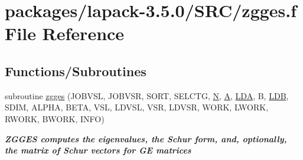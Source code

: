 \hypertarget{zgges_8f}{}\section{packages/lapack-\/3.5.0/\+S\+R\+C/zgges.f File Reference}
\label{zgges_8f}
\subsection*{Functions/\+Subroutines}
\begin{DoxyCompactItemize}
\item 
subroutine \hyperlink{group__complex16GEeigen_ga788ffb82ac609cc3e99de43c4cea3e7b}{zgges} (J\+O\+B\+V\+S\+L, J\+O\+B\+V\+S\+R, S\+O\+R\+T, S\+E\+L\+C\+T\+G, \hyperlink{polmisc_8c_a0240ac851181b84ac374872dc5434ee4}{N}, \hyperlink{classA}{A}, \hyperlink{example__user_8c_ae946da542ce0db94dced19b2ecefd1aa}{L\+D\+A}, B, \hyperlink{example__user_8c_a50e90a7104df172b5a89a06c47fcca04}{L\+D\+B}, S\+D\+I\+M, A\+L\+P\+H\+A, B\+E\+T\+A, V\+S\+L, L\+D\+V\+S\+L, V\+S\+R, L\+D\+V\+S\+R, W\+O\+R\+K, L\+W\+O\+R\+K, R\+W\+O\+R\+K, B\+W\+O\+R\+K, I\+N\+F\+O)
\begin{DoxyCompactList}\small\item\em {\bfseries  Z\+G\+G\+E\+S computes the eigenvalues, the Schur form, and, optionally, the matrix of Schur vectors for G\+E matrices} \end{DoxyCompactList}\end{DoxyCompactItemize}
